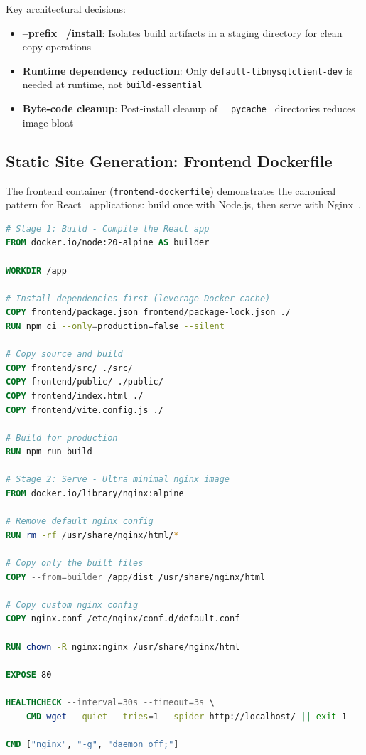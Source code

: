 Key architectural decisions:
\begin{itemize}
    \item \textbf{--prefix=/install}: Isolates build artifacts in a staging directory for clean copy operations
    \item \textbf{Runtime dependency reduction}: Only \texttt{default-libmysqlclient-dev} is needed at runtime, not \texttt{build-essential}
    \item \textbf{Byte-code cleanup}: Post-install cleanup of \texttt{\_\_pycache\_} directories reduces image bloat
\end{itemize}

\subsection{Static Site Generation: Frontend Dockerfile}

The frontend container (\texttt{frontend-dockerfile}) demonstrates the canonical pattern for React~\cite{react} applications: build once with Node.js, then serve with Nginx~\cite{nginx}.

\begin{lstlisting}[float, language=Dockerfile, caption=Frontend Multi-Stage Build (\texttt{frontend-dockerfile})]
# Stage 1: Build - Compile the React app
FROM docker.io/node:20-alpine AS builder

WORKDIR /app

# Install dependencies first (leverage Docker cache)
COPY frontend/package.json frontend/package-lock.json ./
RUN npm ci --only=production=false --silent

# Copy source and build
COPY frontend/src/ ./src/
COPY frontend/public/ ./public/
COPY frontend/index.html ./
COPY frontend/vite.config.js ./

# Build for production
RUN npm run build

# Stage 2: Serve - Ultra minimal nginx image
FROM docker.io/library/nginx:alpine

# Remove default nginx config
RUN rm -rf /usr/share/nginx/html/*

# Copy only the built files
COPY --from=builder /app/dist /usr/share/nginx/html

# Copy custom nginx config
COPY nginx.conf /etc/nginx/conf.d/default.conf

RUN chown -R nginx:nginx /usr/share/nginx/html

EXPOSE 80

HEALTHCHECK --interval=30s --timeout=3s \
    CMD wget --quiet --tries=1 --spider http://localhost/ || exit 1

CMD ["nginx", "-g", "daemon off;"]
\end{lstlisting}

